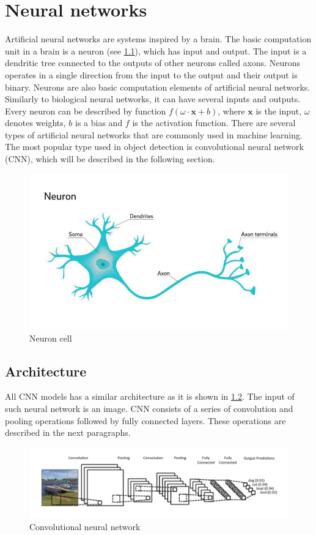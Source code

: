 \documentclass[twoside]{ctuthesis}
\theoremstyle{plain}
\theoremstyle{definition}
\theoremstyle{note}
\begin{document}
\chapter{Neural networks}
Artificial neural networks are systems inspired by a brain.     The basic computation unit in a brain is a neuron (see \ref{neuron}), which has input and output. The input is a dendritic tree connected to the outputs of other neurons called axons. Neurons operates in a single direction from the input to the output and their output is binary.  
Neurons are also basic computation elements of artificial neural networks. Similarly to biological neural networks, it can have several inputs and outputs. Every neuron can be described by function $f\left(\omega \cdot \textbf{x}  + b\right)$, where $\textbf{x}$ is the input, $\omega$ denotes weights, $b$ is a bias and $f$ is the activation function. 
There are several types of artificial neural networks that are commonly used in machine learning. The most popular type used in object detection is convolutional neural network (CNN), which will be described in the following section.
\begin{figure}[h]
\caption{Neuron cell\cite{staff_2018}}
\label{neuron}
\includegraphics[width=\textwidth]{images/neural_networks/2-whyareneuron.jpg}
\end{figure}
\section{Architecture}
All CNN models has a similar architecture as it is shown in \ref{conv_full}. The input of such neural network is an image. CNN consists of a series of convolution and pooling operations followed by fully connected layers. These operations are described in the next paragraphs. 
\begin{figure}[h]
\caption{Convolutional neural network\cite{britz_2016}}
\label{conv_full}
\includegraphics[width=\textwidth]{images/neural_networks/conv_full.png}
\end{figure}
\end{document}
